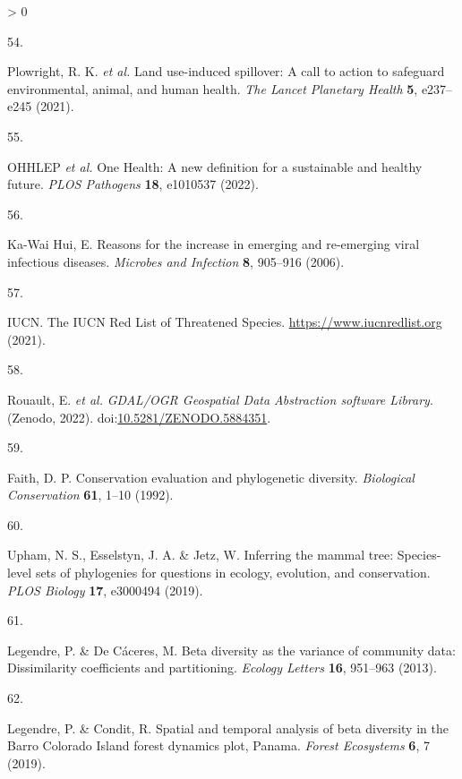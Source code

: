 \documentclass[10pt,oneside]{article}
\newlength{\cslhangindent}
\newlength{\csllabelwidth}
\newenvironment{CSLReferences}[3] %
 {%
  \setlength{\parindent}{0pt}
  \ifodd #1 \everypar{\setlength{\hangindent}{\cslhangindent}}\ignorespaces\fi
  \ifnum #2 > 0
  \setlength{\parskip}{#2\baselineskip}
  \fi
 }%
 {}
\newcommand{\CSLLeftMargin}[1]{\parbox[t]{\maxof{\widthof{#1}}{\csllabelwidth}}{#1}}
\newcommand{\CSLRightInline}[1]{\parbox[t]{\linewidth}{#1}}
\begin{document}
\begin{CSLReferences}{0}{0}
\leavevmode\hypertarget{ref-Plowright2021Land}{}%
\CSLLeftMargin{54. }
\CSLRightInline{Plowright, R. K. \emph{et al.} Land use-induced
spillover: A call to action to safeguard environmental, animal, and
human health. \emph{The Lancet Planetary Health} \textbf{5}, e237--e245
(2021).}

\leavevmode\hypertarget{ref-OHHLEP2022One}{}%
\CSLLeftMargin{55. }
\CSLRightInline{OHHLEP \emph{et al.} One Health: A new definition for a
sustainable and healthy future. \emph{PLOS Pathogens} \textbf{18},
e1010537 (2022).}

\leavevmode\hypertarget{ref-Ka-WaiHui2006Reasons}{}%
\CSLLeftMargin{56. }
\CSLRightInline{Ka-Wai Hui, E. Reasons for the increase in emerging and
re-emerging viral infectious diseases. \emph{Microbes and Infection}
\textbf{8}, 905--916 (2006).}

\leavevmode\hypertarget{ref-IUCN2021Iucn}{}%
\CSLLeftMargin{57. }
\CSLRightInline{IUCN. The IUCN Red List of Threatened Species.
\url{https://www.iucnredlist.org} (2021).}

\leavevmode\hypertarget{ref-RouaultEven2022Gdal}{}%
\CSLLeftMargin{58. }
\CSLRightInline{Rouault, E. \emph{et al.} \emph{GDAL/OGR Geospatial Data
Abstraction software Library}. (Zenodo, 2022).
doi:\href{https://doi.org/10.5281/ZENODO.5884351}{10.5281/ZENODO.5884351}.}

\leavevmode\hypertarget{ref-Faith1992Conservation}{}%
\CSLLeftMargin{59. }
\CSLRightInline{Faith, D. P. Conservation evaluation and phylogenetic
diversity. \emph{Biological Conservation} \textbf{61}, 1--10 (1992).}

\leavevmode\hypertarget{ref-Upham2019Inferring}{}%
\CSLLeftMargin{60. }
\CSLRightInline{Upham, N. S., Esselstyn, J. A. \& Jetz, W. Inferring the
mammal tree: Species-level sets of phylogenies for questions in ecology,
evolution, and conservation. \emph{PLOS Biology} \textbf{17}, e3000494
(2019).}

\leavevmode\hypertarget{ref-Legendre2013Beta}{}%
\CSLLeftMargin{61. }
\CSLRightInline{Legendre, P. \& De Cáceres, M. Beta diversity as the
variance of community data: Dissimilarity coefficients and partitioning.
\emph{Ecology Letters} \textbf{16}, 951--963 (2013).}

\leavevmode\hypertarget{ref-Legendre2019Spatial}{}%
\CSLLeftMargin{62. }
\CSLRightInline{Legendre, P. \& Condit, R. Spatial and temporal analysis
of beta diversity in the Barro Colorado Island forest dynamics plot,
Panama. \emph{Forest Ecosystems} \textbf{6}, 7 (2019).}


\end{CSLReferences}
\end{document}
